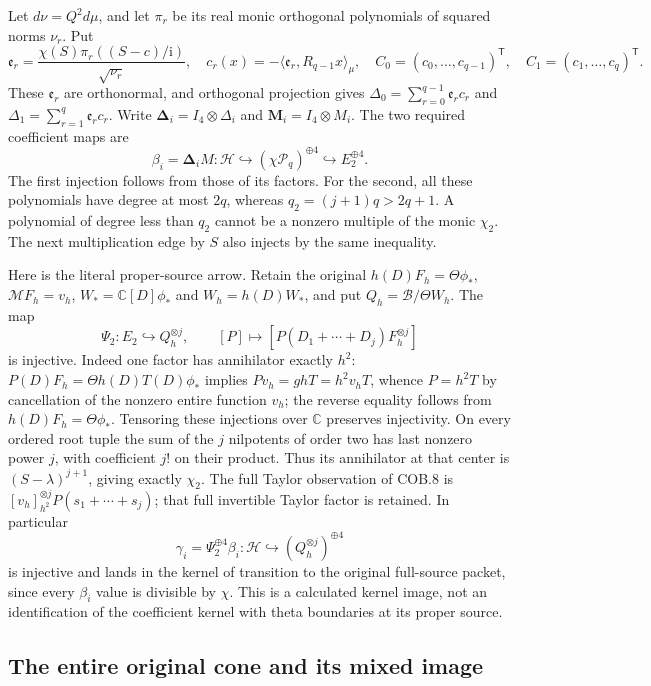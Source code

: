 Let $d\nu=Q^2d\mu$, and let $\pi_r$ be its real monic orthogonal
polynomials of squared norms $\nu_r$.  Put
\[
 \mathfrak e_r=\frac{\chi(S)\pi_r((S-c)/\mathrm i)}{\sqrt{\nu_r}},
 \quad c_r(x)=-\langle\mathfrak e_r,R_{q-1}x\rangle_\mu,
 \quad C_0=(c_0,\ldots,c_{q-1})^{\mathsf T},\quad
 C_1=(c_1,\ldots,c_q)^{\mathsf T}.
 \tag{COB.6}
\]
These $\mathfrak e_r$ are orthonormal, and orthogonal projection gives
$\Delta_0=\sum_{r=0}^{q-1}\mathfrak e_rc_r$ and
$\Delta_1=\sum_{r=1}^{q}\mathfrak e_rc_r$.
Write $\boldsymbol\Delta_i=I_4\otimes\Delta_i$ and
$\mathbf M_i=I_4\otimes M_i$.  The two required coefficient maps are
\[
 \boxed{\beta_i=\boldsymbol\Delta_iM:\mathcal H
                 \hookrightarrow(\chi\mathcal P_q)^{\oplus4}
                 \hookrightarrow E_2^{\oplus4}.}
 \tag{COB.7}
\]
The first injection follows from those of its factors.  For the second,
all these polynomials have degree at most $2q$, whereas
$q_2=(j+1)q>2q+1$.  A polynomial of degree less than $q_2$ cannot
be a nonzero multiple of the monic $\chi_2$.  The next multiplication
edge by $S$ also injects by the same inequality.

Here is the literal proper-source arrow.  Retain the original
$h(D)F_h=\Theta\phi_*$, $\mathcal MF_h=v_h$,
$W_*=\mathbb C[D]\phi_*$ and $W_h=h(D)W_*$, and put
$Q_h=\mathscr B/\Theta W_h$.  The map
\[
 \Psi_2:E_2\hookrightarrow Q_h^{\otimes j},\qquad
 [P]\longmapsto[P(D_1+\cdots+D_j)F_h^{\otimes j}]
 \tag{COB.8}
\]
is injective.  Indeed one factor has annihilator exactly $h^2$:
$P(D)F_h=\Theta h(D)T(D)\phi_*$ implies
$Pv_h=g hT=h^2v_hT$, whence $P=h^2T$ by cancellation of
the nonzero entire function $v_h$; the reverse equality follows
from $h(D)F_h=\Theta\phi_*$.  Tensoring these injections over
$\mathbb C$ preserves injectivity.  On every ordered root tuple
the sum of the $j$ nilpotents of order two has last nonzero power
$j$, with coefficient $j!$ on their product.  Thus its annihilator
at that center is $(S-\lambda)^{j+1}$, giving exactly $\chi_2$.
The full Taylor observation of COB.8 is
$[v_h]_{h^2}^{\otimes j}P(s_1+\cdots+s_j)$; that full invertible
Taylor factor is retained.  In particular
\[
 \gamma_i=\Psi_2^{\oplus4}\beta_i:
       \mathcal H\hookrightarrow(Q_h^{\otimes j})^{\oplus4}
 \tag{COB.9}
\]
is injective and lands in the kernel of transition to the original
full-source packet, since every $\beta_i$ value is divisible by
$\chi$.  This is a calculated kernel image, not an identification
of the coefficient kernel with theta boundaries at its proper source.

\subsection{The entire original cone and its mixed image}

